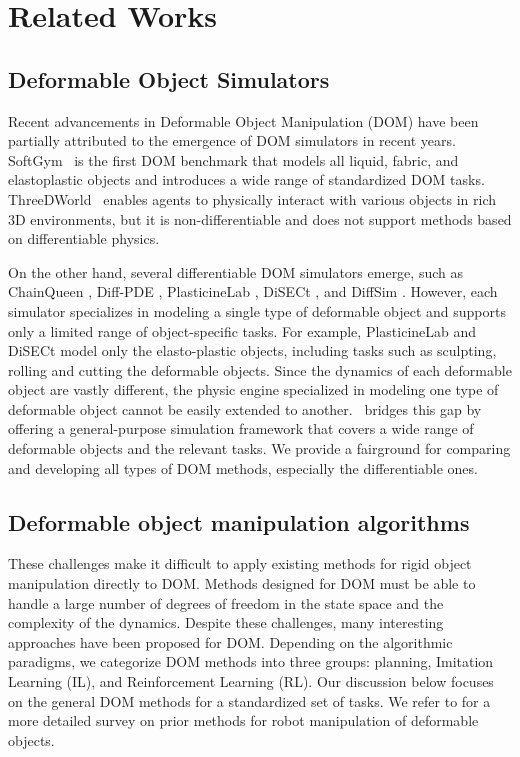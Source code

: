\section{Related Works}
\label{sec:related_works}

\subsection{Deformable Object Simulators}
Recent advancements in Deformable Object Manipulation (DOM) have been partially attributed to the emergence of DOM simulators in recent years. 
SoftGym~\citep{softgym} is the first DOM benchmark that models all liquid, fabric, and elastoplastic objects and introduces a wide range of standardized DOM tasks. ThreeDWorld~\citep{TDW} enables agents to physically interact with various objects in rich 3D environments, but it is non-differentiable and does not support methods based on differentiable physics.

On the other hand, several differentiable DOM simulators emerge, such as ChainQueen  \citep{chainqueen}, Diff-PDE  \citep{diffPDE}, PlasticineLab  \citep{plasticine}, DiSECt  \citep{DiSec}, and DiffSim  \citep{diffsim}. However, each simulator specializes in modeling a single type of deformable object and supports only a limited range of object-specific tasks. For example, PlasticineLab \citep{plasticine} and DiSECt \citep{DiSec} model only the elasto-plastic objects, including tasks such as sculpting, rolling and cutting the deformable objects. Since the dynamics of each deformable object are vastly different, the physic engine specialized in modeling one type of deformable object cannot be easily extended to another. \algo\ bridges this gap by offering a general-purpose simulation framework that covers a wide range of deformable objects and the relevant tasks. We provide a fairground for comparing and developing all types of DOM methods, especially the differentiable ones.

\subsection{Deformable object manipulation algorithms}
These challenges make it difficult to apply existing methods for rigid object manipulation directly to DOM. Methods designed for DOM must be able to handle a large number of degrees of freedom in the state space and the complexity of the dynamics. Despite these challenges, many interesting approaches have been proposed for DOM. Depending on the algorithmic paradigms, we categorize DOM methods into three groups: planning, Imitation Learning (IL), and Reinforcement Learning (RL).  Our discussion below focuses on the general DOM methods for a standardized set of tasks. We refer to \citep{sanchez2018robotic,khalil2010dexterous} for a more detailed survey on prior methods for robot manipulation of deformable objects.

